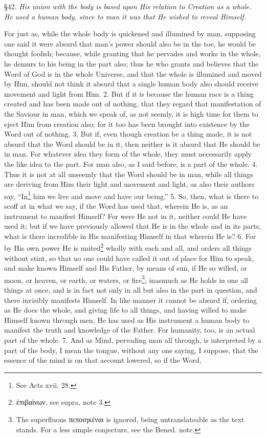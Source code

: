 
§42. \emph{His union with the body is based upon His relation to Creation as a whole. He used a human body, since to man it was that He wished to reveal Himself.}

For just as, while the whole body is quickened and illumined by man, supposing one said it were absurd that man’s power should also be in the toe, he would be thought foolish; because, while granting that he pervades and works in the whole, he demurs to his being in the part also; thus he who grants and believes that the Word of God is in the whole Universe, and that the whole is illumined and moved by Him, should not think it absurd that a single human body also should receive movement and light from Him. 2. But if it is because the human race is a thing created and has been made out of nothing, that they regard that manifestation of the Saviour in man, which we speak of, as not seemly, it is high time for them to eject Him from creation also; for it too has been brought into existence by the Word out of nothing. 3. But if, even though creation be a thing made, it is not absurd that the Word should be in it, then neither is it absurd that He should be in man. For whatever idea they form of the whole, they must necessarily apply the like idea to the part. For man also, as I said before, is a part of the whole. 4. Thus it is not at all unseemly that the Word should be in man, while all things are deriving from Him their light and movement and light, as also their authors say, “In\footnote{See Acts xvii. 28.} him we live and move and have our being.” 5. So, then, what is there to scoff at in what we say, if the Word has used that, wherein He is, as an instrument to manifest Himself? For were He not in it, neither could He have used it; but if we have previously allowed that He is in the whole and in its parts, what is there incredible in His manifesting Himself in that wherein He is? 6. For by His own power He is united\footnote{\textgreek{ἐπιβαίνων}, see supra, note 3.} wholly with each and all, and orders all things without stint, so that no one could have called it out of place for Him to speak, and make known Himself and His Father, by means of sun, if He so willed, or moon, or heaven, or earth, or waters, or fire\footnote{The superfluous \textgreek{πεποιηκέναι} is ignored, being untranslateable as the text stands. For a less simple conjecture, see the Bened. note.}; inasmuch as He holds in one all things at once, and is in fact not only in all but also in the part in question, and there invisibly manifests Himself. In like manner it cannot be absurd if, ordering as He does the whole, and giving life to all things, and having willed to make Himself known through men, He has used as His instrument a human body to manifest the truth and knowledge of the Father. For humanity, too, is an actual part of the whole. 7. And as Mind, pervading man all through, is interpreted by a part of the body, I mean the tongue, without any one saying, I suppose, that the essence of the mind is on that account lowered, so if the Word, 